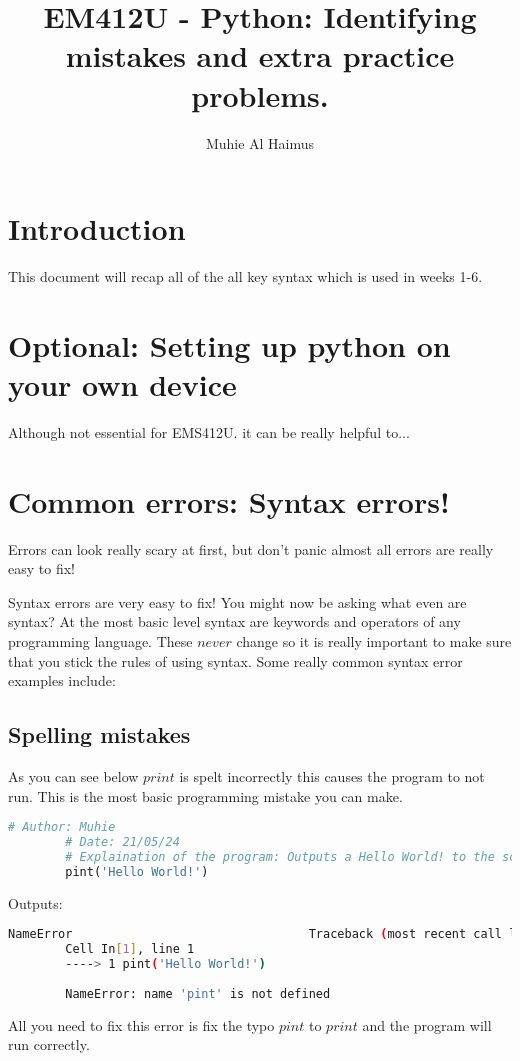 \documentclass{article}
\title{EM412U - Python: Identifying mistakes and extra practice problems.}
\author{Muhie Al Haimus}
\begin{document}
	\maketitle
	\section{Introduction}
	This document will recap all of the all key syntax which is used in weeks 1-6.
	
	\section{Optional: Setting up python on your own device}
	Although not essential for EMS412U. it can be really helpful to...
	\section{Common errors: Syntax errors!}
	Errors can look really scary at first, but don't panic almost all errors are really easy to fix!
	
	Syntax errors are very easy to fix! You might now be asking what even are syntax? At the most basic level syntax are keywords and operators of any programming language. These $never$ change so it is really important to make sure that you stick the rules of using syntax. Some really common syntax error examples include:
	
	\subsection{Spelling mistakes}
	As you can see below $print$ is spelt incorrectly this causes the program to not run. This is the most basic programming mistake you can make.
	\begin{lstlisting}[language=Python]
		# Author: Muhie
		# Date: 21/05/24
		# Explaination of the program: Outputs a Hello World! to the screen
		pint('Hello World!')
	\end{lstlisting}
	Outputs:
	\begin{lstlisting}[language=Bash]
		NameError                                 Traceback (most recent call last)
		Cell In[1], line 1
		----> 1 pint('Hello World!')
		
		NameError: name 'pint' is not defined
	\end{lstlisting}
	All you need to fix this error is fix the typo $pint$ to $print$ and the program will run correctly.
\end{document}
